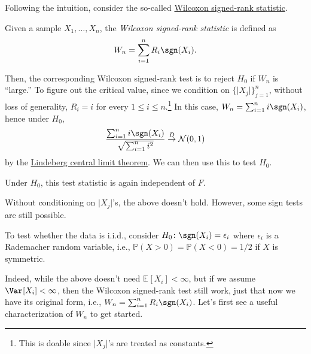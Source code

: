 Following the intuition, consider the so-called \hyperref[def:Wilcoxon-signed-rank-statistic]{Wilcoxon signed-rank statistic}.

\begin{definition}\label{def:Wilcoxon-signed-rank-statistic}
	Given a sample \(X_1, \dots , X_n\), the \emph{Wilcoxon signed-rank statistic} is defined as
	\[
		W_n = \sum_{i=1}^{n} R_i \sgn (X_i).
	\]
\end{definition}

Then, the corresponding Wilcoxon signed-rank test is to reject \(H_0\) if \(W_n\) is ``large.'' To figure out the critical value, since we condition on \(\{ \vert X_j \vert \}_{j = 1}^n \), without loss of generality, \(R_i = i\) for every \(1 \leq i \leq n\).\footnote{This is doable since \(\vert X_j \vert \)'s are treated as constants.} In this case, \(W_n = \sum_{i=1}^{n} i \sgn (X_i)\), hence under \(H_0\),
\[
	\frac{\sum_{i=1}^{n} i \sgn (X_i)}{\sqrt{\sum_{i=1}^{n} i^2} }
	\overset{D}{\to} \mathcal{N} (0, 1)
\]
by the \hyperref[thm:Lindeberg-CLT]{Lindeberg central limit theorem}. We can then use this to test \(H_0\).

\begin{note}
	Under \(H_0\), this test statistic is again independent of \(F\).
\end{note}

Without conditioning on \(\vert X_j \vert \)'s, the above doesn't hold. However, some sign tests are still possible.

\begin{eg}
	To test whether the data is i.i.d., consider \(H_0 \colon \sgn (X_i) = \epsilon _i\) where \(\epsilon _i\) is a Rademacher random variable, i.e., \(\mathbb{P} (X > 0) = \mathbb{P} (X < 0) = 1 / 2\) if \(X\) is symmetric.
\end{eg}

Indeed, while the above doesn't need \(\mathbb{E}_{}[X_i] < \infty \), but if we assume \(\Var_{}[X_i] < \infty \), then the Wilcoxon signed-rank test still work, just that now we have its original form, i.e., \(W_n = \sum_{i=1}^{n} R_i \sgn (X_i)\). Let's first see a useful characterization of \(W_n\) to get started.

